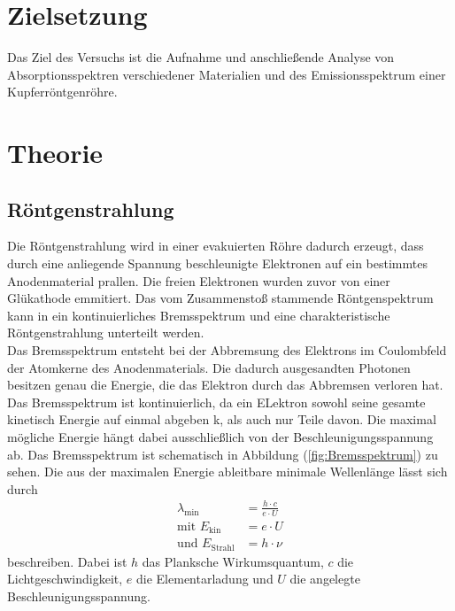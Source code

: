 \section{Zielsetzung}
\label{sec:Zielsetzung}
Das Ziel des Versuchs ist die Aufnahme und anschließende Analyse von Absorptionsspektren verschiedener Materialien und des Emissionsspektrum einer 
Kupferröntgenröhre.
\section{Theorie}
\label{sec:Theorie}
\subsection{Röntgenstrahlung}
Die Röntgenstrahlung wird in einer evakuierten Röhre dadurch erzeugt, dass durch eine anliegende Spannung beschleunigte Elektronen auf ein bestimmtes Anodenmaterial prallen. Die freien Elektronen
wurden zuvor von einer Glükathode emmitiert. Das vom Zusammenstoß stammende Röntgenspektrum kann in ein kontinuierliches Bremsspektrum und eine charakteristische 
Röntgenstrahlung unterteilt werden. \\
Das Bremsspektrum entsteht bei der Abbremsung des Elektrons im Coulombfeld der Atomkerne des Anodenmaterials. Die dadurch ausgesandten Photonen besitzen genau die 
Energie, die das Elektron durch das Abbremsen verloren hat. Das Bremsspektrum ist kontinuierlich, da ein ELektron sowohl seine gesamte kinetisch Energie auf einmal abgeben
k, als auch nur Teile davon. Die maximal mögliche Energie hängt dabei ausschließlich von der Beschleunigungsspannung ab. Das Bremsspektrum ist 
schematisch in Abbildung (\ref{fig:Bremsspektrum}) zu sehen. Die aus der maximalen Energie ableitbare minimale Wellenlänge lässt
sich durch 
\begin{align}
    \lambda_{\text{min}} &= \frac{h \cdot c}{e \cdot U} \label{eqn:lambda} \\
    \text{mit} \,\, E_{\text{kin}} &= e \cdot U \label{eqn:E_kin} \\
    \text{und} \,\, E_{\text{Strahl}} &= h \cdot \nu \label{eqn:E_Strahl}
\end{align}
beschreiben. Dabei ist $h$ das Planksche Wirkumsquantum, $c$ die Lichtgeschwindigkeit, $e$ die Elementarladung und $U$ die angelegte Beschleunigungsspannung.\\
